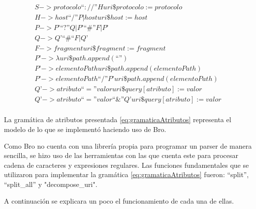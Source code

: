 \begin{equation}\label{eq:gramaticaAtributos}
\begin{aligned}
S -> protocolo “ :// ” H { uri\$protocolo := protocolo } \\
H -> host “/” P | host { uri\$host := host  } \\
P -> P’ “?” Q | P’ “\#” F | P’ \\
Q -> Q’ “\#“ F | Q’ \\
F -> fragment { uri\$fragment := fragment } \\
P’ -> \lambda  { uri\$path.append(“”) } \\
P’ ->  elementoPath { uri\$path.append(elementoPath) } \\
P’ -> elementoPath “/” P’ { uri\$path.append(elementoPath) } \\
Q’ -> atributo “=” valor { uri\$query[atributo] := valor } \\
Q’ -> atributo “=” valor “\&” Q’ { uri\$query[atributo] := valor } \\
\end{aligned}
\end{equation}

    La gramática de atributos presentada \ref{eq:gramaticaAtributos} representa el modelo de lo que se implementó haciendo uso de Bro.

    Como Bro no cuenta con una librería propia para programar un parser de manera sencilla, se hizo uso de las herramientas con las que cuenta este para procesar cadena de caracteres y expresiones regulares. Las funciones fundamentales que se utilizaron para implementar  la gramática \ref{eq:gramaticaAtributos} fueron: “split”, “split\_all” y "decompose\_uri".

A continuación se explicara un poco el funcionamiento de cada una de ellas.

